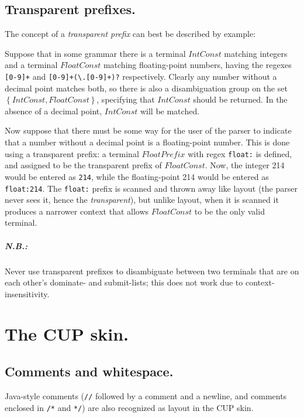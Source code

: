 \documentclass[12pt,english,twoside]{report}
\begin{document}
\section{Transparent prefixes.}

The concept of a \emph{transparent prefix} can best be described by
example:

Suppose that in some grammar there is a terminal $IntConst$ matching
integers and a terminal $FloatConst$ matching floating-point numbers,
having the regexes \texttt{{[}0-9]+} and
\texttt{{[}0-9]+(\textbackslash{}.{[}0-9]+)?} respectively. Clearly
any number without a decimal point matches both, so there is also a
disambiguation group on the set $\left\{ IntConst,FloatConst\right\}
$, specifying that $IntConst$ should be returned. In the absence
of a decimal point, $IntConst$ will be matched.

Now suppose that there must be some way for the user of the parser
to indicate that a number without a decimal point is a floating-point
number. This is done using a transparent prefix: a terminal $FloatPrefix$
with regex \texttt{float:} is defined, and assigned to be the transparent
prefix of $FloatConst$. Now, the integer 214 would be entered as
\texttt{214}, while the floating-point 214 would be entered as \texttt{float:214}.
The \texttt{float:} prefix is scanned and thrown away like layout
(the parser never sees it, hence the \emph{transparent}), but unlike
layout, when it is scanned it produces a narrower context that allows
$FloatConst$ to be the only valid terminal.


\paragraph{N.B.:}

Never use transparent prefixes to disambiguate between two terminals
that are on each other's dominate- and submit-lists; this does not
work due to context-insensitivity.

\chapter{\label{cha:CUP-skin.}The CUP skin.}


\section{Comments and whitespace.}

Java-style comments (\texttt{//} followed by a comment and a newline,
and comments enclosed in \texttt{/{*}} and \texttt{{*}/}) are also
recognized as layout in the CUP skin. 
\end{document}
